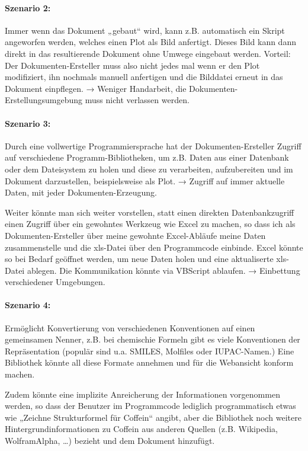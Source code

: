 \paragraph{Szenario 2:} Immer wenn das Dokument „gebaut“ wird, kann z.B.
automatisch ein Skript angeworfen werden, welches einen Plot als Bild
anfertigt. Dieses Bild kann dann direkt in das resultierende Dokument ohne
Umwege eingebaut werden. Vorteil: Der Dokumenten-Ersteller muss also nicht jedes
mal wenn er den Plot modifiziert, ihn nochmals manuell anfertigen und
die Bilddatei erneut in das Dokument einpflegen. → Weniger Handarbeit,
die Dokumenten-Erstellungsumgebung muss nicht verlassen werden.

\paragraph{Szenario 3:} Durch eine vollwertige Programmiersprache hat
der Dokumenten-Ersteller Zugriff auf verschiedene Programm-Bibliotheken,
um z.B. Daten aus einer Datenbank oder dem Dateisystem zu holen und diese
zu verarbeiten, aufzubereiten und im Dokument darzustellen, beispielsweise
als Plot. → Zugriff auf immer aktuelle Daten, mit jeder Dokumenten-Erzeugung.

Weiter könnte man sich weiter vorstellen, statt einen direkten Datenbankzugriff
einen Zugriff über ein gewohntes Werkzeug wie Excel zu machen,
so dass ich als Dokumenten-Ersteller über meine gewohnte Excel-Abläufe
meine Daten zusammenstelle und die xls-Datei über den Programmcode einbinde.
Excel könnte so bei Bedarf geöffnet
werden, um neue Daten holen und eine aktualiserte xls-Datei ablegen. Die
Kommunikation könnte via VBScript ablaufen. → Einbettung
verschiedener Umgebungen.

\paragraph{Szenario 4:} Ermöglicht Konvertierung von verschiedenen
Konventionen auf einen gemeinsamen Nenner, z.B. bei chemischie Formeln
gibt es viele Konventionen der Repräsentation (populär sind u.a.
SMILES, Molfiles oder IUPAC-Namen.)
Eine Bibliothek könnte all diese Formate annehmen und
für die Webansicht konform machen.

Zudem könnte eine implizite Anreicherung der Informationen vorgenommen werden,
so dass der Benutzer im Programmcode lediglich programmatisch etwas wie
„Zeichne Strukturformel für Coffein“ angibt,
aber die Bibliothek noch weitere Hintergrundinformationen
zu Coffein aus anderen Quellen (z.B. Wikipedia, WolframAlpha, \ldots) bezieht
und dem Dokument hinzufügt.

